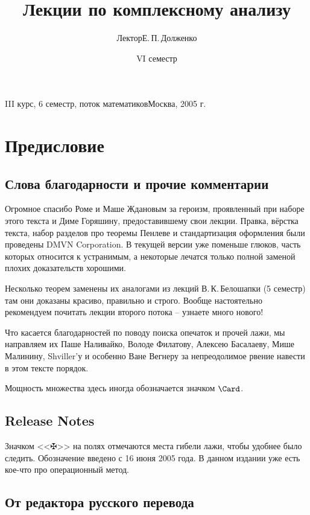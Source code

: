 \documentclass[a4paper]{article}
\title{Лекции по комплексному анализу}
\author{Лектор\т Е.\,П.\,Долженко}
\date{VI семестр}
\begin{document}
{III курс, 6 семестр, поток математиков}{Москва, 2005 г.}

\pagebreak

\tableofcontents

\pagebreak

\section*{Предисловие}

\subsection*{Слова благодарности и прочие комментарии}

Огромное спасибо Роме и Маше Ждановым за героизм, проявленный при наборе этого текста и Диме Горяшину,
предоставившему свои лекции.
Правка, вёрстка текста, набор разделов про теоремы Пенлеве и стандартизация оформления были проведены
DMVN Corporation. В текущей версии уже поменьше глюков, часть которых относится к устранимым,
а некоторые лечатся только полной заменой плохих доказательств хорошими.

\medskip

Несколько теорем заменены их аналогами из лекций В.\,К.\,Белошапки (5 семестр) там они
доказаны красиво, правильно и строго. Вообще настоятельно рекомендуем почитать лекции второго
потока --  узнаете много нового!

Что касается благодарностей по поводу поиска опечаток и прочей лажи, мы направляем их
Паше Наливайко, Володе Филатову, Алексею Басалаеву, Мише Малинину, Shviller'у и особенно Ване Вегнеру за непреодолимое рвение
навести в этом тексте порядок.

Мощность множества здесь иногда обозначается значком $\Card$.

\subsection*{Release Notes}

Значком <<$\maltese$>> на полях отмечаются места гибели лажи, чтобы удобнее было следить.
Обозначение введено с 16 июня 2005 года. В данном издании уже есть кое-что про операционный метод.

\subsection*{От редактора русского перевода}
\end{document}
